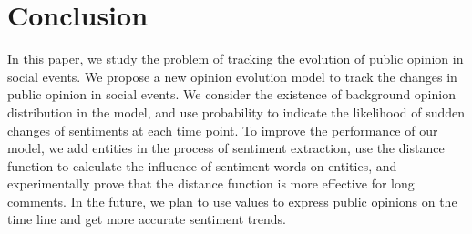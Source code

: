 \documentclass[runningheads]{llncs}
\begin{document}
\section{Conclusion}\label{sec:conclusion}
In this paper, we study the problem of tracking the evolution of public opinion in social events. We propose a new opinion evolution model to track the changes in public opinion in social events. We consider the existence of background opinion distribution in the model, and use probability to indicate the likelihood of sudden changes of sentiments at each time point. To improve the performance of our model, we add entities in the process of sentiment extraction, use the distance function to calculate the influence of sentiment words on entities, and experimentally prove that the distance function is more effective for long comments. In the future, we plan to use values to express public opinions on the time line and get more accurate sentiment trends.
\end{document}
